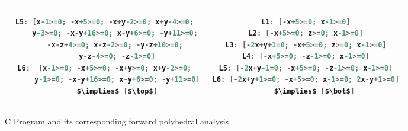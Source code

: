 {\begin{figure}[t]
\begin{tabular}{c|c}
\begin{lstlisting}[mathescape=true,language=C]
L5: [x-1>=0; -x+5>=0; -x+y-2>=0; x+y-4>=0; 
     y-3>=0; -x-y+16>=0; x-y+6>=0; -y+11>=0; 
     -x-z+4>=0; x-z-2>=0; -y-z+10>=0; 
     y-z-4>=0; -z-1>=0]
L6:  [x-1>=0; -x+5>=0; -x+y>=0; x+y-2>=0; 
      y-1>=0; -x-y+16>=0; x-y+6>=0; -y+11>=0] 
     $\implies$ [$\top$]
\end{lstlisting}
&
\begin{lstlisting}[mathescape=true,language=C]
L1: [-x+5>=0; x-1>=0]
L2: [-x+5>=0; z>=0; x-1>=0]
L3: [-2x+y+1=0; -x+5>=0; z>=0; x-1>=0]
L4: [-x+5>=0; -z-1>=0; x-1>=0]
L5: [-2x+y-1=0; -x+5>=0; -z-1>=0; x-1>=0]
L6: [-2x+y+1>=0; -x+5>=0; x-1>=0; 2x-y+1>=0]
    $\implies$ [$\bot$]
\end{lstlisting}
\\
\hline
\end{tabular}
\caption{\label{fig:polyhedra}
C Program and its corresponding forward polyhedral analysis}
\end{figure}
}

